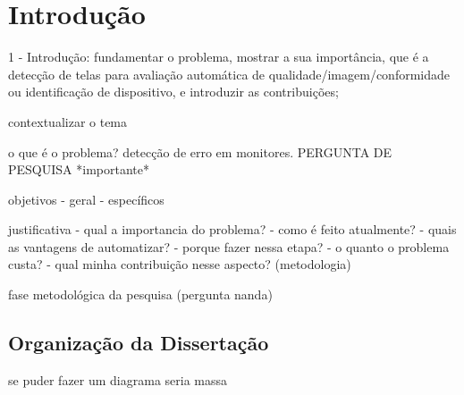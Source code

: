 \chapter{Introdução}



1 - Introdução: fundamentar o problema, mostrar a sua importância, que é a detecção de telas para avaliação automática de qualidade/imagem/conformidade ou identificação de dispositivo, e introduzir as contribuições;

contextualizar o tema

o que é o problema?
detecção de erro em monitores.
PERGUNTA DE PESQUISA *importante*

objetivos
 - geral
 - específicos
 
justificativa
 - qual a importancia do problema?
 - como é feito atualmente?
 - quais as vantagens de automatizar?
 - porque fazer nessa etapa?
 - o quanto o problema custa?
 - qual minha contribuição nesse aspecto? (metodologia)

fase metodológica da pesquisa (pergunta nanda)









 
 \section{Organização da Dissertação}
 
 se puder fazer um diagrama seria massa
